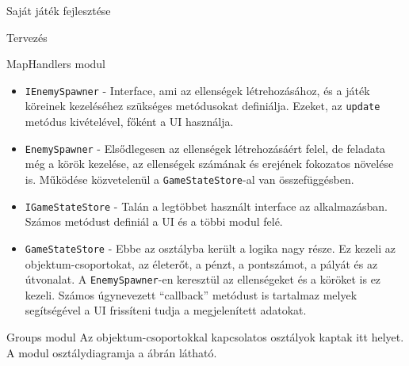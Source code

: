 \begin{MyChapter}{Saját játék fejlesztése}
\begin{MySection}{Tervezés}
\begin{MySubSection}{MapHandlers modul}
\begin{itemize}
				\item \texttt{IEnemySpawner} - Interface, ami az ellenségek létrehozásához, és a játék köreinek kezeléséhez szükséges metódusokat definiálja. Ezeket, az \texttt{update} metódus kivételével, főként a UI használja.
				
				\item \texttt{EnemySpawner} - Elsődlegesen az ellenségek létrehozásáért felel, de feladata még a körök kezelése, az ellenségek számának és erejének fokozatos növelése is. Működése közvetelenül a \texttt{GameStateStore}-al van összefüggésben.
				
				\item \texttt{IGameStateStore} - Talán a legtöbbet használt interface az alkalmazásban. Számos metódust definiál a UI és a többi modul felé.
				
				\item \texttt{GameStateStore} - Ebbe az osztályba került a logika nagy része. Ez kezeli az objektum-csoportokat, az életerőt, a pénzt, a pontszámot, a pályát és az útvonalat. A \texttt{EnemySpawner}-en keresztül az ellenségeket és a köröket is ez kezeli. Számos úgynevezett ``callback'' metódust is tartalmaz melyek segítségével a UI frissíteni tudja a megjelenített adatokat.
			\end{itemize}
		\end{MySubSection}
	
		\begin{MySubSection}{Groups modul}
			Az objektum-csoportokkal kapcsolatos osztályok kaptak itt helyet.
			A modul osztálydiagramja a  ábrán látható.
	

\end{MySubSection}
\end{MySection}
\end{MyChapter}
